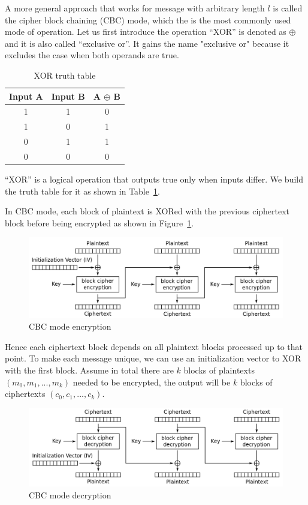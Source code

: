 \par A more general approach that works for message with arbitrary length $l$ is called the cipher block chaining (CBC) mode, which the is the most commonly used mode of operation. Let us first introduce the operation ``XOR'' is denoted as $\oplus$ and it is also called ``exclusive or''. It gains the name "exclusive or" because it excludes the case when both operands are true.
\begin{table}[ht]
    \centering
    \begin{tabular}{|c|c|c|}
        \hline Input A & Input B & A $\oplus$ B \\ \hline\hline
        1 & 1 & 0 \\ \hline 
        1 & 0 & 1 \\ \hline
        0 & 1 & 1 \\ \hline
        0 & 0 & 0 \\ \hline
    \end{tabular}
    \caption{XOR truth table}\label{tab:xor-truth-table}
\end{table}
``XOR'' is a logical operation that outputs true only when inputs differ. We build the truth table for it as shown in Table~\ref{tab:xor-truth-table}.
\par In CBC mode, each block of plaintext is XORed with the previous ciphertext block before being encrypted as shown in Figure~\ref{fig:cbc-encryption}.
\begin{figure}[ht]
    \centering
    \includegraphics[width=14cm]{figures/encryption/CBC_encryption.png}
    \caption{CBC mode encryption\cite{cbc_enc}}\label{fig:cbc-encryption}
\end{figure}
Hence each ciphertext block depends on all plaintext blocks processed up to that point. To make each message unique, we can use an initialization vector to XOR with the first block. Assume in total there are $k$ blocks of plaintexts $(m_0, m_1, ..., m_k)$ needed to be encrypted, the output will be $k$ blocks of ciphertexts $(c_0, c_1, ..., c_k)$.
\begin{figure}[ht]
    \centering
    \includegraphics[width=14cm]{figures/encryption/CBC_decryption.png}
    \caption{CBC mode decryption\cite{cbc_dec}}\label{fig:cbc-decryption}
\end{figure}
